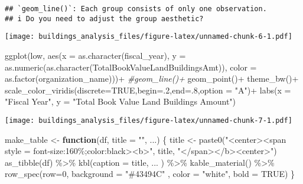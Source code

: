 \documentclass[
]{article}
\newenvironment{Shaded}{\begin{snugshade}}{\end{snugshade}}
\newcommand{\AttributeTok}[1]{\textcolor[rgb]{0.77,0.63,0.00}{#1}}
\newcommand{\CommentTok}[1]{\textcolor[rgb]{0.56,0.35,0.01}{\textit{#1}}}
\newcommand{\ConstantTok}[1]{\textcolor[rgb]{0.00,0.00,0.00}{#1}}
\newcommand{\ControlFlowTok}[1]{\textcolor[rgb]{0.13,0.29,0.53}{\textbf{#1}}}
\newcommand{\DecValTok}[1]{\textcolor[rgb]{0.00,0.00,0.81}{#1}}
\newcommand{\FunctionTok}[1]{\textcolor[rgb]{0.00,0.00,0.00}{#1}}
\newcommand{\NormalTok}[1]{#1}
\newcommand{\OtherTok}[1]{\textcolor[rgb]{0.56,0.35,0.01}{#1}}
\newcommand{\SpecialCharTok}[1]{\textcolor[rgb]{0.00,0.00,0.00}{#1}}
\newcommand{\StringTok}[1]{\textcolor[rgb]{0.31,0.60,0.02}{#1}}
\begin{document}
\begin{verbatim}
## `geom_line()`: Each group consists of only one observation.
## i Do you need to adjust the group aesthetic?
\end{verbatim}

\texttt{[image: buildings\_analysis\_files/figure-latex/unnamed-chunk-6-1.pdf]}

\begin{Shaded}
\begin{Highlighting}[]
  \FunctionTok{ggplot}\NormalTok{(low, }\FunctionTok{aes}\NormalTok{(}\AttributeTok{x =} \FunctionTok{as.character}\NormalTok{(fiscal\_year), }\AttributeTok{y =} \FunctionTok{as.numeric}\NormalTok{(}\FunctionTok{as.character}\NormalTok{(TotalBookValueLandBuildingsAmt)), }\AttributeTok{color =} \FunctionTok{as.factor}\NormalTok{(organization\_name)))}\SpecialCharTok{+}
    \CommentTok{\#geom\_line()+}
    \FunctionTok{geom\_point}\NormalTok{()}\SpecialCharTok{+}
    \FunctionTok{theme\_bw}\NormalTok{()}\SpecialCharTok{+}
    \FunctionTok{scale\_color\_viridis}\NormalTok{(}\AttributeTok{discrete=}\ConstantTok{TRUE}\NormalTok{,}\AttributeTok{begin=}\NormalTok{.}\DecValTok{2}\NormalTok{,}\AttributeTok{end=}\NormalTok{.}\DecValTok{8}\NormalTok{,}\AttributeTok{option =} \StringTok{"A"}\NormalTok{)}\SpecialCharTok{+}
    \FunctionTok{labs}\NormalTok{(}\AttributeTok{x =} \StringTok{"Fiscal Year"}\NormalTok{, }\AttributeTok{y =} \StringTok{"Total Book Value Land Buildings Amount"}\NormalTok{)}
\end{Highlighting}
\end{Shaded}

\texttt{[image: buildings\_analysis\_files/figure-latex/unnamed-chunk-7-1.pdf]}

\begin{Shaded}
\begin{Highlighting}[]
\NormalTok{make\_table }\OtherTok{\textless{}{-}} \ControlFlowTok{function}\NormalTok{(df, }\AttributeTok{title =} \StringTok{""}\NormalTok{, ...) \{}
\NormalTok{  title }\OtherTok{\textless{}{-}} \FunctionTok{paste0}\NormalTok{(}\StringTok{"\textless{}center\textgreater{}\textless{}span style = \textquotesingle{}font{-}size:160\%;color:black\textquotesingle{}\textgreater{}\textless{}b\textgreater{}"}\NormalTok{,}
\NormalTok{                  title,}
                  \StringTok{"\textless{}/span\textgreater{}\textless{}/b\textgreater{}\textless{}center\textgreater{}"}\NormalTok{)}
   \FunctionTok{as\_tibble}\NormalTok{(df) }\SpecialCharTok{\%\textgreater{}\%}
    \FunctionTok{kbl}\NormalTok{(}\AttributeTok{caption =}\NormalTok{ title, ... ) }\SpecialCharTok{\%\textgreater{}\%}
    \FunctionTok{kable\_material}\NormalTok{() }\SpecialCharTok{\%\textgreater{}\%}
    \FunctionTok{row\_spec}\NormalTok{(}\AttributeTok{row=}\DecValTok{0}\NormalTok{, }\AttributeTok{background =} \StringTok{"\#43494C"}\NormalTok{ , }\AttributeTok{color =} \StringTok{"white"}\NormalTok{, }\AttributeTok{bold =} \ConstantTok{TRUE}\NormalTok{)}
\NormalTok{\}}
\end{Highlighting}
\end{Shaded}
\end{document}
